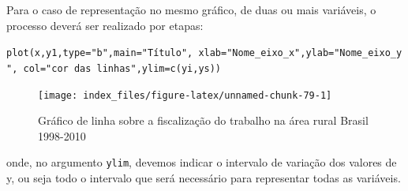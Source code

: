 \documentclass[12pt,brazil,oneside]{book}
\newenvironment{Shaded}{\begin{snugshade}}{\end{snugshade}}
\newcommand{\DataTypeTok}[1]{\textcolor[rgb]{0.13,0.29,0.53}{#1}}
\newcommand{\DecValTok}[1]{\textcolor[rgb]{0.00,0.00,0.81}{#1}}
\newcommand{\KeywordTok}[1]{\textcolor[rgb]{0.13,0.29,0.53}{\textbf{#1}}}
\newcommand{\NormalTok}[1]{#1}
\newcommand{\OperatorTok}[1]{\textcolor[rgb]{0.81,0.36,0.00}{\textbf{#1}}}
\newcommand{\StringTok}[1]{\textcolor[rgb]{0.31,0.60,0.02}{#1}}
\begin{document}
Para o caso de representação no mesmo gráfico, de duas ou mais variáveis, o processo deverá ser realizado por etapas:

\texttt{plot(x,y1,type="b",main="Título",\ xlab="Nome\_eixo\_x",ylab="Nome\_eixo\_y",\ col="cor\ das\ linhas",ylim=c(yi,ys))}

\begin{Shaded}
\end{Shaded}

\begin{figure}[H]

{\centering \texttt{[image: index\_files/figure-latex/unnamed-chunk-79-1]} 

}

\caption{Gráfico de linha sobre a fiscalização do trabalho na área rural Brasil 1998-2010}\label{fig:unnamed-chunk-79}
\end{figure}

onde, no argumento \texttt{ylim}, devemos indicar o intervalo de variação dos valores de y, ou seja todo o intervalo que será necessário para representar todas as variáveis.
\end{document}

